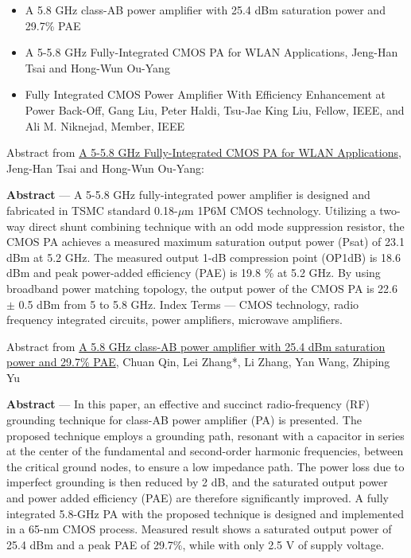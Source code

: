\documentclass{article}
\begin{document}
\begin{itemize}
	\item A 5.8 GHz class-AB power amplifier with 25.4 dBm saturation power and 29.7\% PAE
	\item A 5-5.8 GHz Fully-Integrated CMOS PA for WLAN Applications, Jeng-Han Tsai and Hong-Wun Ou-Yang
	\item Fully Integrated CMOS Power Amplifier With Efficiency Enhancement at Power Back-Off, Gang Liu, Peter Haldi, Tsu-Jae King Liu, Fellow, IEEE, and Ali M. Niknejad, Member, IEEE
\end{itemize}

Abstract from \href{https://ieeexplore.ieee.org/document/6830155}{A 5-5.8 GHz Fully-Integrated CMOS PA for WLAN Applications}, Jeng-Han Tsai and Hong-Wun Ou-Yang:

\begin{info}
	\textbf{Abstract} — A 5-5.8 GHz fully-integrated power amplifier is designed and fabricated in TSMC standard 0.18-$\mu$m 1P6M CMOS technology. Utilizing a two-way direct shunt combining technique with an odd mode suppression resistor, the CMOS PA achieves a measured maximum saturation output power (Psat) of 23.1 dBm at 5.2 GHz. The measured output 1-dB compression point (OP1dB) is 18.6 dBm and peak power-added efficiency (PAE) is 19.8 \% at 5.2 GHz. By using broadband power matching topology, the output power of the CMOS PA is 22.6 $\pm$ 0.5 dBm from 5 to 5.8 GHz. Index Terms — CMOS technology, radio frequency integrated circuits, power amplifiers, microwave amplifiers.
\end{info}



Abstract from \href{https://www.sciengine.com/SCIS/doi/10.1007/s11432-016-0299-4?&trans=true}{A 5.8 GHz class-AB power amplifier with 25.4 dBm saturation power and 29.7\% PAE}, Chuan Qin,  Lei Zhang*,  Li Zhang,  Yan Wang,  Zhiping Yu

\begin{info}
	\textbf{Abstract} — In this paper, an effective and succinct radio-frequency (RF) grounding technique for class-AB power amplifier (PA) is presented. The proposed technique employs a grounding path, resonant with a capacitor in series at the center of the fundamental and second-order harmonic frequencies, between the critical ground nodes, to ensure a low impedance path. The power loss due to imperfect grounding is then reduced by 2 dB, and the saturated output power and power added efficiency (PAE) are therefore significantly improved. A fully integrated 5.8-GHz PA with the proposed technique is designed and implemented in a 65-nm CMOS process. Measured result shows a saturated output power of 25.4 dBm and a peak PAE of 29.7\%, while with only 2.5 V of supply voltage.
\end{info}
\end{document}
